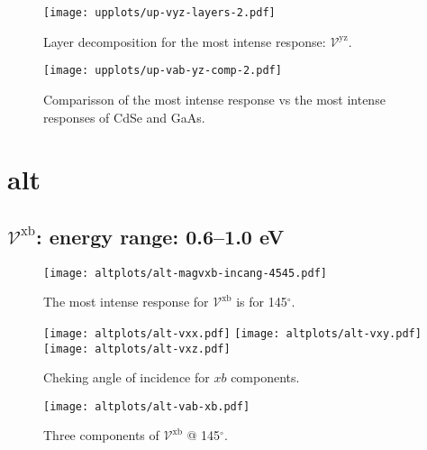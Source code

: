 \documentclass{article}
\let\Oldsection\section
\renewcommand{\section}{\FloatBarrier\Oldsection}
\let\Oldsubsection\subsection
\renewcommand{\subsection}{\FloatBarrier\Oldsubsection}
\begin{document}
\begin{figure}[ht]
    \centering
    \texttt{[image: upplots/up-vyz-layers-2.pdf]}
    \caption{Layer decomposition for the most intense response:
    $\mathcal{V}^{\mathrm{yz}}$.}
    \label{fig:up-lay2}
\end{figure}

\begin{figure}[ht]
    \centering
    \texttt{[image: upplots/up-vab-yz-comp-2.pdf]}
    \caption{Comparisson of the most intense response vs the most intense
    responses of CdSe and GaAs.}
    \label{fig:up-comp2}
\end{figure}




\section{alt} %
\label{sec:alt}

\subsection{$\mathcal{V}^{\mathrm{xb}} $: energy range: 0.6--1.0 eV }
\begin{figure}[h!]
    \centering
    \texttt{[image: altplots/alt-magvxb-incang-4545.pdf]}
    \caption{The most intense response for $\mathcal{V}^{\mathrm{xb}} $ is for 
    145$^{\circ}$.}
    \label{fig:alt-magvxbincang1}
\end{figure}
\begin{figure}[h!]
    \centering
    \texttt{[image: altplots/alt-vxx.pdf]}
    \texttt{[image: altplots/alt-vxy.pdf]}\\
    \texttt{[image: altplots/alt-vxz.pdf]}
    \caption{Cheking angle of incidence for $xb$ components.}
    \label{fig:alt-xbangcomp}
\end{figure}
\begin{figure}[t!]
    \centering
    \texttt{[image: altplots/alt-vab-xb.pdf]}
    \caption{Three components of $\mathcal{V}^{\mathrm{xb}} $ @ 145$^{\circ}$.}
    \label{fig:alt-vxb1}
\end{figure}
\end{document}
